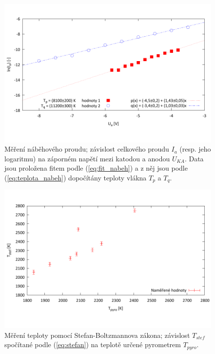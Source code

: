 \documentclass[english]{article}
\begin{document}
	\begin{figure}[h!]
	\begin{center}
	    \vspace*{-1cm}
		\includegraphics[width=\linewidth]{../gnuplot/nabeh.pdf}
	    \vspace*{-1,5cm}
		\caption{Měření náběhového proudu; závislost celkového proudu $I_a$ (resp. jeho logaritmu) na záporném napětí mezi katodou a anodou $U_{KA}$. Data jsou proložena fitem podle (\ref{eq:fit_nabeh}) a z něj jsou podle (\ref{eq:teplota_nabeh}) dopočítány teploty vlákna $T_p$ a $T_q$. } 
		\label{fig:g_nabeh}
	\end{center}
	\end{figure}		
	
	\begin{figure}[h!]
	\begin{center}
	    \vspace*{-1cm}
		\includegraphics[width=\linewidth]{../gnuplot/stefpyro.pdf}
	    \vspace*{-1,5cm}
		\caption{Měření teploty pomocí Stefan-Boltzmannova zákona; závislost $T_{stef}$ spočítané podle (\ref{eq:stefan}) na teplotě určené pyrometrem $T_{pyro}$. } 
		\label{fig:g_stefpyro}
	\end{center}
	\end{figure}		
				
\end{document}
